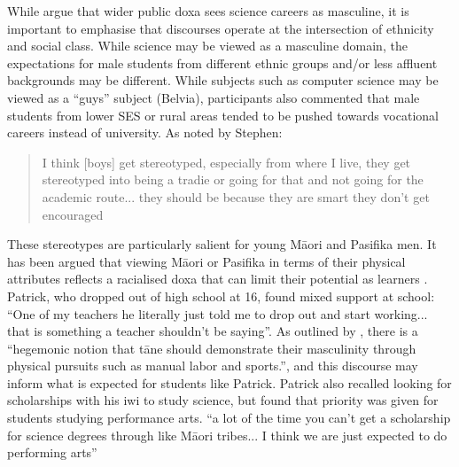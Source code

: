 While \cite{Archer_2013} argue that wider public doxa sees science careers as masculine, it is important to emphasise that discourses operate at the intersection of ethnicity and social class. While science may be viewed as a masculine domain, the expectations for male students from different ethnic groups and/or less affluent backgrounds may be different. While subjects such as computer science may be viewed as a ``guys'' subject (Belvia), participants also commented that male students from lower SES or rural areas tended to be pushed towards vocational careers instead of university. As noted by Stephen: \blockquote{I think [boys] get stereotyped, especially from where I live, they get stereotyped into being a tradie or going for that and not going for the academic route... they should be because they are smart they don't get encouraged}. These stereotypes are particularly salient for young M\={a}ori and Pasifika men. It has been argued that viewing M\={a}ori or Pasifika in terms of their physical attributes reflects a racialised doxa that can limit their potential as learners \citep{hokowhitu2008understanding}. Patrick, who dropped out of high school at 16, found mixed support at school: ``One of my teachers he literally just told me to drop out and start working... that is something a teacher shouldn't be saying''. As outlined by  \cite{hokowhitu2004tackling}, there is a ``hegemonic notion that t\={a}ne should demonstrate their masculinity through physical pursuits such as manual labor and sports.'', and this discourse may inform what is expected for students like Patrick. Patrick also recalled looking for scholarships with his iwi to study science, but found that priority was given for students studying performance arts.  ``a lot of the time you can’t get a scholarship for science degrees through like M\={a}ori tribes... I think we are just expected to do performing arts''

